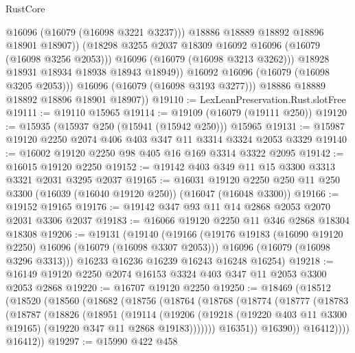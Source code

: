 \begin{lexlean}{RustCore}
\begin{coremodule}
                        @16096
                        (@16079 (@16098 @3221 @3237)))
                      @18886
                      @18889
                      @18892
                      @18896
                      @18901
                      @18907))
                  (@18298 @3255 @2037 @18309 @16092 @16096 (@16079 (@16098 @3256 @2053)))
                  @16096
                  (@16079 (@16098 @3213 @3262)))
                @18928
                @18931
                @18934
                @18938
                @18943
                @18949))
            @16092
            @16096
            (@16079 (@16098 @3205 @2053)))
          @16096
          (@16079 (@16098 @3193 @3277)))
        @18886
        @18889
        @18892
        @18896
        @18901
        @18907))
@19110 := LexLeanPreservation.Rust.slotFree
@19111 := @19110 @15965
@19114 := @19109 (@16079 (@19111 @250))
@19120 := @15935 (@15937 @250 (@15941 (@15942 @250))) @15965
@19131 := @15987 @19120 @2250 @2074 @406 @403 @347 @11 @3314 @3324 @2053 @3329
@19140 := @16002 @19120 @2250 @98 @405 @16 @169 @3314 @3322 @2095
@19142 := @16015 @19120 @2250
@19152 := @19142 @403 @349 @11 @15 @3300 @3313 @3321 @2031 @3295 @2037
@19165 := @16031
    @19120
    @2250
    @250
    @11
    @250
    @3300
    (@16039 (@16040 @19120 @250))
    (@16047 (@16048 @3300))
@19166 := @19152 @19165
@19176 := @19142 @347 @93 @11 @14 @2868 @2053 @2070 @2031 @3306 @2037
@19183 := @16066 @19120 @2250 @11 @346 @2868 @18304 @18308
@19206 := @19131
    (@19140
      (@19166
        (@19176 @19183 (@16090 @19120 @2250) @16096 (@16079 (@16098 @3307 @2053)))
        @16096
        (@16079 (@16098 @3296 @3313)))
      @16233
      @16236
      @16239
      @16243
      @16248
      @16254)
@19218 := @16149 @19120 @2250 @2074 @16153 @3324 @403 @347 @11 @2053 @3300 @2053 @2868
@19220 := @16707 @19120 @2250
@19250 := @18469
    (@18512
      (@18520
        (@18560
          (@18682
            (@18756
              (@18764
                (@18768
                  (@18774
                    (@18777
                      (@18783
                        (@18787
                          (@18826
                            (@18951
                              (@19114
                                (@19206
                                  (@19218
                                    (@19220 @403 @11 @3300 @19165)
                                    (@19220 @347 @11 @2868 @19183)))))))
                        @16351))
                    @16390))
                @16412))))
        @16412))
@19297 := @15990
    @422
    @458

\end{coremodule}
\end{lexlean}
